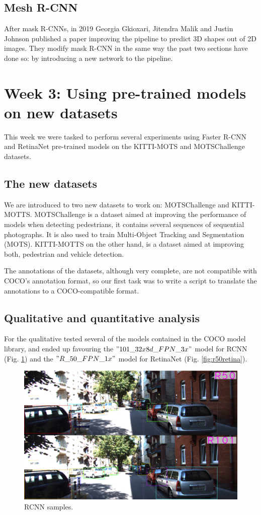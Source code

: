 \documentclass[11pt,a4paper,twocolumn,twoside]{article}
\begin{document}
\subsection{Mesh R-CNN}
After mask R-CNNs, in 2019 Georgia Gkioxari, Jitendra Malik and Justin Johnson\cite{gkioxari_malik_johnson_2019} published a paper improving the pipeline to predict 3D shapes out of 2D images. They modify mask R-CNN in the same way the past two sections have done so: by introducing a new network to the pipeline. 

\section{Week 3: Using pre-trained models on new datasets}

This week we were tasked to perform several experiments using Faster R-CNN and RetinaNet pre-trained models on the KITTI-MOTS and MOTSChallenge datasets.

\subsection{The new datasets}

We are introduced to two new datasets to work on: MOTSChallenge and KITTI-MOTTS. MOTSChallenge is a dataset aimed at improving the performance of models when detecting pedestrians, it contains several sequences of sequential photographs. It is also used to train Multi-Object Tracking and Segmentation (MOTS). KITTI-MOTTS on the other hand, is a dataset aimed at improving both, pedestrian and vehicle detection.

The annotations of the datasets, although very complete, are not compatible with COCO's annotation format, so our first task was to write a script to translate the annotations to a COCO-compatible format.

\subsection{Qualitative and quantitative analysis}

For the qualitative tested several of the models contained in the COCO model library, and ended up favouring the $"101\_32x8d\_FPN\_3x"$ model for RCNN (Fig. \ref{fig:r50r101}) and the $"R\_50\_FPN\_1x"$ model for RetinaNet (Fig. \ref{fig:r50retina}).

\begin{figure}[ht]
    \centering
    \includegraphics[width=0.8\linewidth]{Resources/Images/r50r101.png}
    \caption{RCNN samples.}
    \label{fig:r50r101}
    \end{figure}
\end{document}

